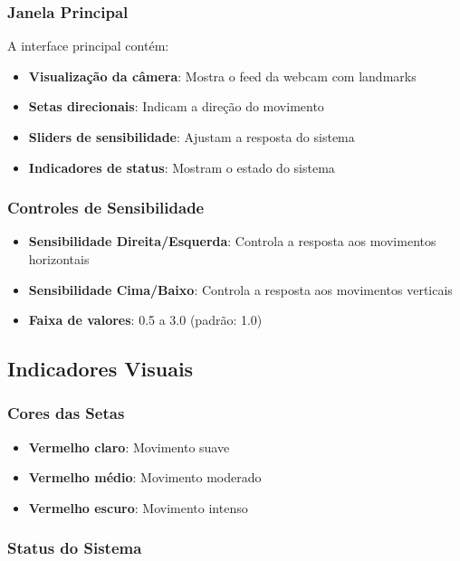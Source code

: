 \documentclass[12pt,a4paper]{article}
\begin{document}
\subsubsection{Janela Principal}

A interface principal contém:

\begin{itemize}
    \item \textbf{Visualização da câmera}: Mostra o feed da webcam com landmarks
    \item \textbf{Setas direcionais}: Indicam a direção do movimento
    \item \textbf{Sliders de sensibilidade}: Ajustam a resposta do sistema
    \item \textbf{Indicadores de status}: Mostram o estado do sistema
\end{itemize}

\subsubsection{Controles de Sensibilidade}

\begin{itemize}
    \item \textbf{Sensibilidade Direita/Esquerda}: Controla a resposta aos movimentos horizontais
    \item \textbf{Sensibilidade Cima/Baixo}: Controla a resposta aos movimentos verticais
    \item \textbf{Faixa de valores}: 0.5 a 3.0 (padrão: 1.0)
\end{itemize}

\subsection{Indicadores Visuais}

\subsubsection{Cores das Setas}

\begin{itemize}
    \item \textbf{Vermelho claro}: Movimento suave
    \item \textbf{Vermelho médio}: Movimento moderado
    \item \textbf{Vermelho escuro}: Movimento intenso
\end{itemize}

\subsubsection{Status do Sistema}
\end{document}
